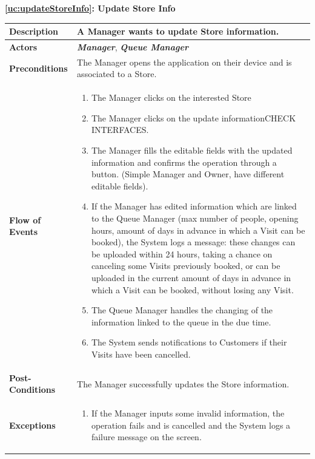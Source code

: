 \documentclass[a4paper, 10pt, oneside]{article}
\newcommand*{\lorenzo}[1]{\textcolor{BurntOrange}{#1}}
\begin{document}
\begin{center}
{\textbf{\ref{uc:updateStoreInfo}: Update Store Info}}
\end{center}
\begin{tabularx}{\linewidth}{| l | X |}
	
	\hline
	\textbf{Description} & A Manager wants to update Store information.\\
	

	\hline
	\textbf{Actors} & \textbf{\textit{Manager}}, \textit{\textbf{Queue Manager}}\\
	
	\hline
	\textbf{Preconditions} & The Manager opens the application on their device and is associated to a Store.\\
	
	\hline
	\textbf{Flow of Events} & \parbox{0.7\textwidth}{	
		\begin{enumerate}
			\item The Manager clicks on the interested Store
			\item The Manager clicks on the update information\lorenzo{CHECK INTERFACES}.
			\item The Manager fills the editable fields with the updated information and confirms the operation through a button. (Simple Manager and Owner, have different editable fields).
			\item If the Manager has edited information which are linked to the Queue Manager (max number of people, opening hours, amount of days in advance in which a Visit can be booked), the System logs a message: these changes can be uploaded within 24 hours, taking a chance on canceling some Visits previously booked, or can be uploaded in the current amount of days in advance in which a Visit can be booked, without losing any Visit.
			\item The Queue Manager handles the changing of the information linked to the queue in the due time.
			\item The System sends notifications to Customers if their Visits have been cancelled.
	\end{enumerate}}\\
	
	\hline
	\textbf{Post-Conditions} & The Manager successfully updates the Store information.\\
	
	\hline
	\textbf{Exceptions} & \parbox{0.7\textwidth}{ \begin{enumerate}
			\item If the Manager inputs some invalid information, the operation fails and is cancelled and the System logs a failure message on the screen.
		\end{enumerate}}\\

	\hline
	
\end{tabularx}
\end{document}
